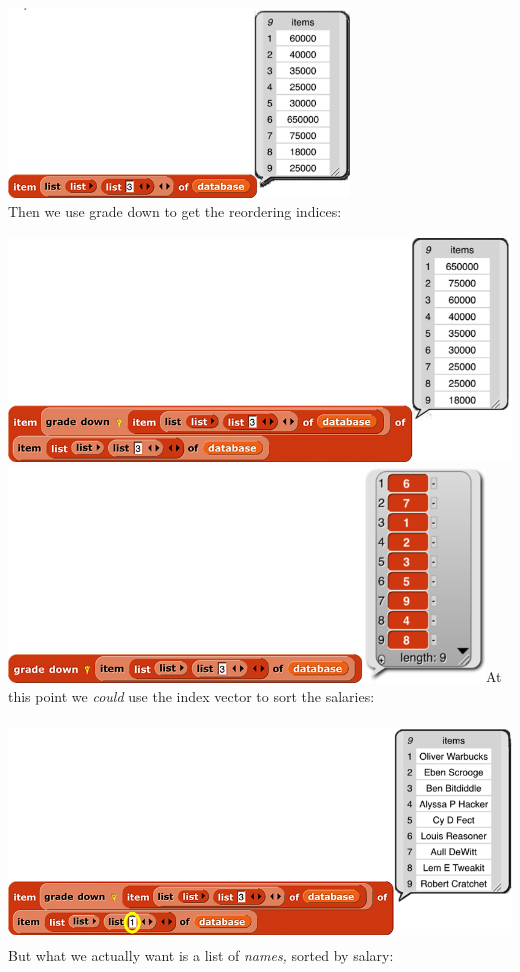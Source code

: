 \includegraphics[width=3.55903in,height=1.97639in]{media/image1305.png}\\
Then we use grade down to get the reordering indices:

\includegraphics[width=5.33333in,height=2.37333in]{media/image1306.png}\includegraphics[width=4.97847in,height=2.23333in]{media/image1307.png}At
this point we \emph{could} use the index vector to sort the salaries:

\includegraphics[width=5.59333in,height=2.3in]{media/image1308.png}But
what we actually want is a list of \emph{names,} sorted by salary:

